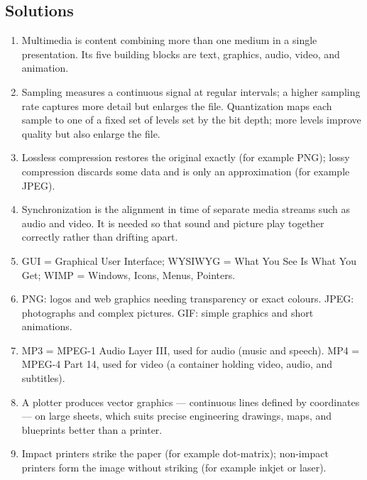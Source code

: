 \documentclass[11pt]{article}
\begin{document}
\subsection*{Solutions}
\begingroup\small
\begin{enumerate}[label=\arabic*.]
  \item Multimedia is content combining more than one medium in a single
    presentation. Its five building blocks are text, graphics, audio, video,
    and animation.
  \item Sampling measures a continuous signal at regular intervals; a higher
    sampling rate captures more detail but enlarges the file. Quantization maps
    each sample to one of a fixed set of levels set by the bit depth; more
    levels improve quality but also enlarge the file.
  \item Lossless compression restores the original exactly (for example PNG);
    lossy compression discards some data and is only an approximation (for
    example JPEG).
  \item Synchronization is the alignment in time of separate media streams such
    as audio and video. It is needed so that sound and picture play together
    correctly rather than drifting apart.
  \item GUI = Graphical User Interface; WYSIWYG = What You See Is What You Get;
    WIMP = Windows, Icons, Menus, Pointers.
  \item PNG: logos and web graphics needing transparency or exact colours.
    JPEG: photographs and complex pictures. GIF: simple graphics and short
    animations.
  \item MP3 = MPEG-1 Audio Layer III, used for audio (music and speech). MP4 =
    MPEG-4 Part 14, used for video (a container holding video, audio, and
    subtitles).
  \item A plotter produces vector graphics --- continuous lines defined by
    coordinates --- on large sheets, which suits precise engineering drawings,
    maps, and blueprints better than a printer.
  \item Impact printers strike the paper (for example dot-matrix); non-impact
    printers form the image without striking (for example inkjet or laser).
\end{enumerate}
\endgroup
\end{document}
